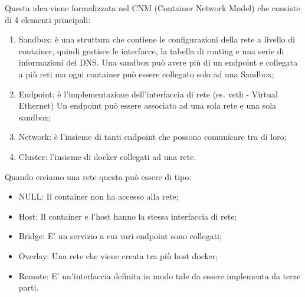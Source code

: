 \documentclass[11pt, twocolumn]{article}
\newenvironment{myitemize}
{ \begin{itemize}[topsep=0ex]
		\setlength{\itemsep}{0pt}
		\setlength{\parskip}{0pt}
		\setlength{\parsep}{0pt}     }
	{ \end{itemize}                  }
\begin{document}
Questa idea viene formalizzata nel CNM (Container Network Model) che consiste di 4 elementi principali:
\begin{enumerate}[noitemsep, topsep=0ex]
	\item Sandbox: è una struttura che contiene le configurazioni della rete a livello di container, quindi gestisce le interfacce, la tabella di routing e una serie di informazioni del DNS. Una sandbox può avere più di un endpoint e collegata a più reti ma ogni container può essere collegato solo ad una Sandbox;
	\item Endpoint: è l'implementazione dell'interfaccia di rete (es. veth - Virtual Ethernet) Un endpoint può essere associato ad una sola rete e una sola sandbox;
	\item Network: è l'insieme di tanti endpoint che possono comunicare tra di loro;
	\item Cluster: l'insieme di docker collegati ad una rete.
\end{enumerate}
Quando creiamo una rete questa può essere di tipo:
\begin{myitemize}
	\item NULL: Il container non ha accesso alla rete;
	\item Host: Il container e l'host hanno la stessa interfaccia di rete;
	\item Bridge: E' un servizio a cui vari endpoint sono collegati;
	\item Overlay: Una rete che viene creata tra più host docker;
	\item Remote: E' un'interfaccia definita in modo tale da essere implementa da terze parti.
\end{myitemize}
\end{document}
